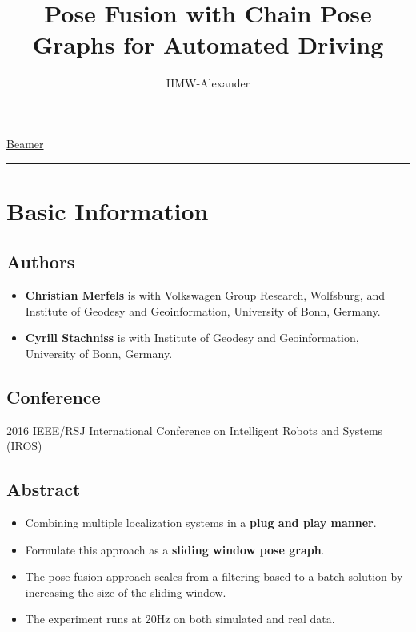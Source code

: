 \documentclass[letterpaper,11pt]{article}
\title{\textbf{Pose Fusion with Chain Pose Graphs for Automated Driving}}
\author{HMW-Alexander}
\begin{document}
	
\maketitle

\tableofcontents
\newpage

\href{./beamer.pdf}{Beamer}

\begin{center}\rule{\textwidth}{1pt}\end{center}
\section{Basic Information}

\subsection{Authors}

\begin{itemize}
	\item \textbf{Christian Merfels} is with Volkswagen Group Research, Wolfsburg, and Institute of Geodesy and Geoinformation, University of Bonn, Germany.
	\item \textbf{Cyrill Stachniss} is with Institute of Geodesy and Geoinformation, University of Bonn, Germany.
\end{itemize}

\subsection{Conference}

2016 IEEE/RSJ International Conference on Intelligent Robots and Systems (IROS)

\subsection{Abstract}

\begin{itemize}
	\item Combining multiple localization systems in a \textbf{plug and play manner}.
	\item Formulate this approach as a \textbf{sliding window pose graph}.
	\item The pose fusion approach scales from a filtering-based to a batch solution by increasing the size of the sliding window.
	\item The experiment runs at 20Hz on both simulated and real data.
\end{itemize}
\end{document}
